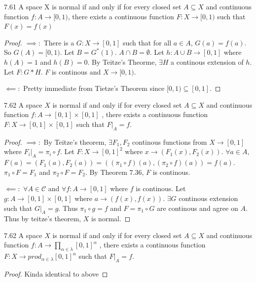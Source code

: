 \documentclass{article}
\newcommand*{\subeq}{\subseteq}
\newcommand*{\empset}{\emptyset}
\begin{document}
\bigskip

\begin{claim}{7.61}\label{Claim 7.61.}
    A space X is normal if and only if for every closed set $A \subeq X$ and continuous function $f: A \to [0, 1)$, there exists a continuous function $F: X \to [0, 1)$ such that $F(x) = f(x)$   
\end{claim}
\begin{proof}
    $\implies: $ There is a $G: X \to [0, 1]$ such that for all $a \in A$, $G(a) = f(a)$. So $G(A) = [0, 1)$. Let $B = G^*(1)$. $A \cap B = \empset$. Let $h: A \cup B \to [0, 1]$ where $h(A) = 1$ and $h(B) = 0$. By Teitze's Theorme, $\exists H$ a continous extension of $h$. Let $F: G * H$. $F$ is continous and $X \to [0, 1)$.                 
    
    $\impliedby:$ Pretty immediate from Tietze's Theorem since $[0, 1)\subeq [0, 1]$.             
\end{proof}

\bigskip

\begin{claim}{7.62}\label{Claim 7.62.}
    A space $X$ is normal if and only if for every closed set $A \subeq X$ and continuous function $f: A \to [0, 1] \times [0, 1]$ , there exists a continuous function $F: X \to [0, 1] \times [0, 1]$  such that $F|_A = f$.
\end{claim}
\begin{proof}
    $\implies:$ By Teitze's theorem, $\exists F_1, F_2$ continous functions from $X \to [0, 1]$ where $F_i|_{A} = \pi_i \circ f$. Let $F: X \to [0, 1]^2$ where $x \to (F_1(x), F_2(x))$. $\forall a \in A$, $F(a) = (F_1(a), F_2(a)) = ((\pi_1 \circ f)(a), (\pi_2 \circ f)(a)) = f(a)$. $\pi_1 \circ F = F_1$ and $\pi_2 \circ F = F_2$. By Theorem 7.36, $F$ is continous. 
    
    $\impliedby: $ $\forall A \in \mathcal{C}$ and $\forall f: A \to [0, 1]$ where $f$ is continous. Let $g: A \to [0, 1] \times [0, 1]$ where $a \to (f(x), f(x))$. $\exists G$ continous extension such that $G|_A = g$. Thus $\pi_1 \circ g = f$ and $F = \pi_1 \circ G$ are continous and agree on $A$. Thus by teitze's theorem, $X$ is normal.                 
\end{proof}

\bigskip

\begin{claim}{7.62}\label{Claim 7.62.}
    A space $X$ is normal if and only if for every closed set $A \subeq X$ and continuous function $f: A \to \prod_{\alpha \in \lambda}[0, 1]^\alpha$ , there exists a continuous function $F: X \to prod_{\alpha \in \lambda}[0, 1]^\alpha$  such that $F|_A = f$.
\end{claim}
\begin{proof}
    Kinda identical to above
\end{proof}
\end{document}
